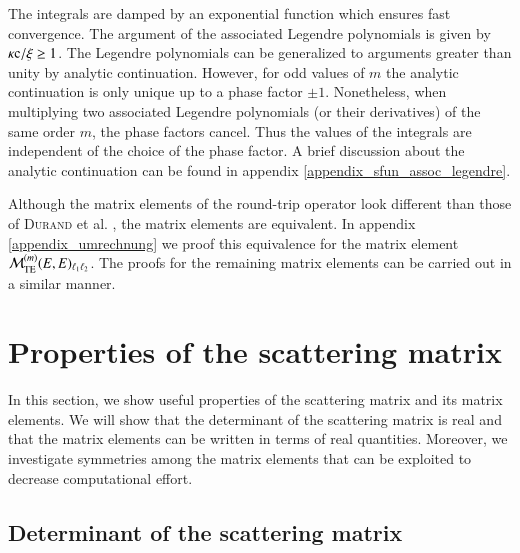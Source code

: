 The integrals are damped by an exponential function which ensures fast
convergence. The argument of the associated Legendre polynomials is given by
$\kappa\mathrm{c}/\xi \ge 1$. The Legendre polynomials can be generalized to arguments
greater than unity by analytic continuation. However, for odd values of $m$ the
analytic continuation is only unique up to a phase factor $\pm1$. Nonetheless,
when multiplying two associated Legendre polynomials (or their derivatives) of
the same order $m$, the phase factors cancel. Thus the values of the integrals
are independent of the choice of the phase factor. A brief discussion about the
analytic continuation can be found in appendix
\ref{appendix_sfun_assoc_legendre}.

Although the matrix elements of the round-trip operator look different than
those of \textsc{Durand} et al. \cite{Durand, ThermalCasimirEffect}, the matrix
elements are equivalent. In appendix \ref{appendix_umrechnung} we proof this
equivalence for the matrix element $\mathcal{M}_{\mathrm{TE}}^{(m)}(E,E)_{\ell_1\ell_2}$.
The proofs for the remaining matrix elements can be carried out in a similar
manner.


\section{Properties of the scattering matrix}

In this section, we show useful properties of the scattering matrix and its
matrix elements. We will show that the determinant of the scattering matrix is
real and that the matrix elements can be written in terms of real quantities.
Moreover, we investigate symmetries among the matrix elements that can be
exploited to decrease computational effort.

\subsection{Determinant of the scattering matrix}

